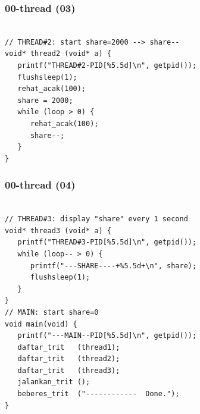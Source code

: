 \documentclass[aspectratio=169, xcolor=table, notheorems, hyperref={pdfpagelabels=false}]{beamer}
\begin{document}
\begin{frame}[fragile]
\frametitle{00-thread (03)}
\begin{lstlisting}[basicstyle=\ttfamily\large]        %  54

// THREAD#2: start share=2000 --> share--
void* thread2 (void* a) {
   printf("THREAD#2-PID[%5.5d]\n", getpid());
   flushsleep(1);
   rehat_acak(100);
   share = 2000;
   while (loop > 0) {
      rehat_acak(100);
      share--;
   }
}

\end{lstlisting}
\end{frame}

\begin{frame}[fragile]
\frametitle{00-thread (04)}
\begin{lstlisting}[basicstyle=\ttfamily\small]        %  65
% \begin{lstlisting}[basicstyle=\ttfamily\large]        %  54

// THREAD#3: display "share" every 1 second
void* thread3 (void* a) {
   printf("THREAD#3-PID[%5.5d]\n", getpid());
   while (loop-- > 0) {
      printf("---SHARE----+%5.5d+\n", share);
      flushsleep(1);
   }
}
// MAIN: start share=0
void main(void) {
   printf("---MAIN--PID[%5.5d]\n", getpid());
   daftar_trit   (thread1);
   daftar_trit   (thread2);
   daftar_trit   (thread3);
   jalankan_trit ();
   beberes_trit  ("------------  Done.");
}

\end{lstlisting}
\end{frame}
\end{document}

